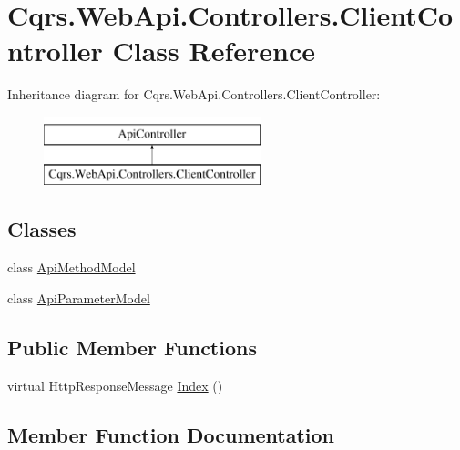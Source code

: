 \hypertarget{classCqrs_1_1WebApi_1_1Controllers_1_1ClientController}{}\section{Cqrs.\+Web\+Api.\+Controllers.\+Client\+Controller Class Reference}
\label{classCqrs_1_1WebApi_1_1Controllers_1_1ClientController}
Inheritance diagram for Cqrs.\+Web\+Api.\+Controllers.\+Client\+Controller\+:\begin{figure}[H]
\begin{center}
\leavevmode
\includegraphics[height=2.000000cm]{classCqrs_1_1WebApi_1_1Controllers_1_1ClientController}
\end{center}
\end{figure}
\subsection*{Classes}
\begin{DoxyCompactItemize}
\item 
class \hyperlink{classCqrs_1_1WebApi_1_1Controllers_1_1ClientController_1_1ApiMethodModel}{Api\+Method\+Model}
\item 
class \hyperlink{classCqrs_1_1WebApi_1_1Controllers_1_1ClientController_1_1ApiParameterModel}{Api\+Parameter\+Model}
\end{DoxyCompactItemize}
\subsection*{Public Member Functions}
\begin{DoxyCompactItemize}
\item 
virtual Http\+Response\+Message \hyperlink{classCqrs_1_1WebApi_1_1Controllers_1_1ClientController_abcd1d9049d9e3cee06558ccf055639f3_abcd1d9049d9e3cee06558ccf055639f3}{Index} ()
\end{DoxyCompactItemize}


\subsection{Member Function Documentation}
\mbox{\label{classCqrs_1_1WebApi_1_1Controllers_1_1ClientController_abcd1d9049d9e3cee06558ccf055639f3_abcd1d9049d9e3cee06558ccf055639f3}} 

